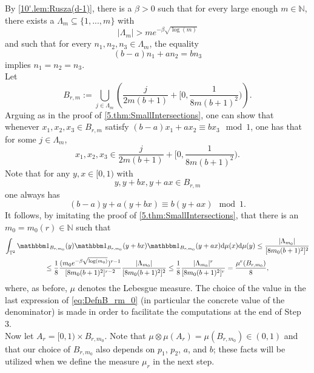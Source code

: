\documentclass[11pt,american,preprint]{elsarticle}
\numberwithin{equation}{section}
\theoremstyle{plain}
\theoremstyle{plain*}
\theoremstyle{plain}
\theoremstyle{plain*}
\theoremstyle{plain}
\theoremstyle{plain*}
\theoremstyle{remark}
\theoremstyle{remark*}
\theoremstyle{remark}
\theoremstyle{remark*}
\theoremstyle{remark}
\theoremstyle{remark*}
\theoremstyle{plain}
\theoremstyle{definition}
\theoremstyle{plain}
\theoremstyle{plain} %
\newcommand{\N}{\mathbb{N}}
\begin{document}
By \cref{10'.lem:Rusza(d-1)}, there is a $\beta>0$ such that  for every large enough $m\in\N$, there exists a $\Lambda_m\subseteq \{1,...,m\}$ with  
$$ 
|\Lambda_m|>me^{-\beta\sqrt{\log(m)}}
$$
and such that for every $n_1,n_2,n_3\in \Lambda_m$, the equality 
$$(b-a)n_1+an_2=bn_3$$
implies $n_1=n_2=n_3$.\\
Let 
$$B_{r,m}:=\bigcup_{j\in\Lambda_m}\left(\frac{j}{2m(b+1)}+[0,\frac{1}{8m(b+1)^2})\right).$$
Arguing as in the proof of \cref{5.thm:SmallIntersections}, one can show that whenever $x_1,x_2,x_3\in B_{r,m}$
satisfy $(b-a)x_1+ax_2\equiv bx_3\mod 1$, one has that for some $j\in \Lambda_m$, 
$$x_1,x_2,x_3\in \frac{j}{2m(b+1)}+[0,\frac{1}{8m(b+1)^2}).$$
Note that  for any $y,x\in [0,1)$  with 
$$y,y+bx,y+ax\in B_{r,m}$$
one always has  
$$(b-a)y+a(y+bx)\equiv b(y+ax)\mod 1.$$
It follows, by imitating the proof of   \cref{5.thm:SmallIntersections}, that there is an  $m_0=m_0(r)\in\N$ such that 
\begin{multline}\label{eq:DefnB_rm_0}
\int_{\mathbb T^2} \mathbbm 1_{B_{r,m_0}}(y)\mathbbm 1_{B_{r,m_0}}(y+bx)\mathbbm 1_{B_{r,m_0}}(y+ax)\text{d}\mu(x)\text{d}\mu(y)\leq\frac{|\Lambda_{m_0}|}{[8m_0(b+1)^2]^2}\\
\leq\frac{1}{8}\frac{(m_0e^{-\beta\sqrt{\log(m_0)}})^{r-1}}{[8m_0(b+1)^2]^{r-2}} \frac{|\Lambda_{m_0}|}{[8m_0(b+1)^2]^2}\leq \frac{1}{8}\frac{|\Lambda_{m_0}|^r}{[8m_0(b+1)^2]^r}=\frac{\mu^{r}(B_{r,m_0})}{8},
\end{multline}
 where, as before, $\mu$ denotes the Lebesgue measure. The choice of the value in the last expression of \eqref{eq:DefnB_rm_0} (in particular the concrete value of the denominator) is made in order to facilitate the computations at the end of Step 3.\\
Now let  $A_r=[0,1)\times B_{r,m_0}$. Note that $\mu\otimes\mu(A_r)=\mu(B_{r,m_0})\in (0,1)$ and that our choice of $B_{r,m_0}$ also depends on $p_1$, $p_2$, $a$, and $b$; these facts will be utilized when we define the measure $\mu_r$ in the next step.\\
\end{document}
